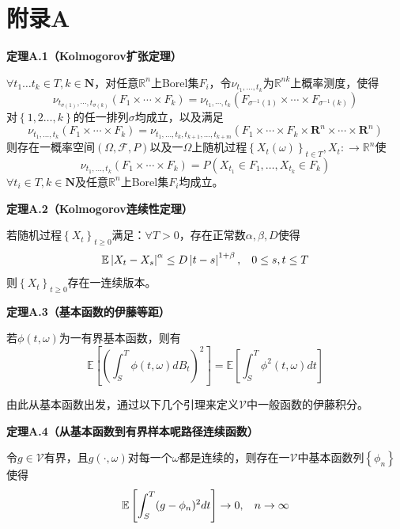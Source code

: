 \documentclass[UTF8，12pt]{ctexart}
\numberwithin{equation}{section}
\begin{document}
\section{附录A}

\vspace{0.3cm}
\noindent \textbf{定理A.1（Kolmogorov扩张定理）}

$\forall t_1\ldots t_k\in T,k\in \textbf{N}$，对任意$\mathbb{R}^n$上Borel集$F_i$，令$\nu_{t_1,\ldots,t_k}$为$\mathbb{R}^{nk}$上概率测度，使得
\[
\nu_{t_{\sigma(1)}, \cdots, t_{\sigma(k)}}(F_1 \times \cdots \times F_k) = \nu_{t_1, \cdots, t_k}(F_{\sigma^{-1}(1)} \times \cdots \times F_{\sigma^{-1}(k)})
\]
对$\left\{1,2\ldots,k\right\}$的任一排列$\sigma$均成立，以及满足
\[
\nu_{t_1, \dots, t_k} (F_1 \times \cdots \times F_k) = \nu_{t_1, \dots, t_k, t_{k+1}, \dots, t_{k+m}} (F_1 \times \cdots \times F_k \times \mathbf{R}^n \times \cdots \times \mathbf{R}^n)
\]
则存在一概率空间$(\Omega,\mathcal{F},P)$以及一$\Omega$上随机过程$\left \{ X_t(\omega)\right \}_{t\in T},X_t:\to \mathbb{R}^n$使
\[
\nu_{t_1, \dots, t_k} (F_1 \times \cdots \times F_k) = P(X_{t_1}\in F_1,\ldots,X_{t_k}\in F_k)
\]
$\forall t_i\in T,k\in \textbf{N}$及任意$\mathbb{R}^n$上Borel集$F_i$均成立。

\vspace{0.3cm}
\noindent \textbf{定理A.2（Kolmogorov连续性定理）}

若随机过程$\left \{ X_t\right \}_{t\ge 0}$满足：$\forall T>0$，存在正常数$\alpha,\beta,D$使得
\[
\mathbb{E}\left\vert X_t-X_s\right\vert^\alpha\le D\left\vert t-s\right\vert^{1+\beta},\hspace{0.3cm} 0\le s,t\le T
\]
则$\left \{ X_t\right \}_{t\ge 0}$存在一连续版本。

\vspace{0.3cm}
\noindent \textbf{定理A.3（基本函数的伊藤等距）}

若$\phi(t,\omega)$为一有界基本函数，则有
\[
\mathbb{E}\left[ (\int_{S}^{T}\phi(t,\omega)dB_t)^2\right]=\mathbb{E}\left[ \int_{S}^{T}\phi^2(t,\omega)dt\right]
\]

由此从基本函数出发，通过以下几个引理来定义$\mathcal{V}$中一般函数的伊藤积分。

\vspace{0.3cm}
\noindent \textbf{定理A.4（从基本函数到有界样本呢路径连续函数）}

令$g\in\mathcal{V}$有界，且$g(\cdot,\omega)$对每一个$\omega$都是连续的，则存在一$\mathcal{V}$中基本函数列$\left\{\phi_n\right\}$使得
\[
\mathbb{E}\left[\int_{S}^{T}(g-\phi_n)^2dt\right]\to 0,\hspace{0.3cm}n\to\infty
\]
\end{document}
